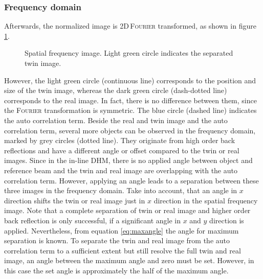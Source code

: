 \documentclass{article}
\begin{document}
\subsubsection{Frequency domain}
Afterwards, the normalized image is 2D\,\textsc{Fourier} transformed, as shown in figure \ref{fig:kpic}.
\begin{figure}[!ht]
    \centering
    \caption{Spatial frequency image. Light green circle indicates the separated twin image.}
    \label{fig:kpic}
\end{figure}
However, the light green circle (continuous line) corresponds to the position and size of the twin image, whereas the dark green circle (dash-dotted line) corresponds to the real image. In fact, there is no difference between them, since the \textsc{Fourier} transformation is symmetric. The blue circle (dashed line) indicates the auto correlation term. Beside the real and twin image and the auto correlation term, several more objects can be observed in the frequency domain, marked by grey circles (dotted line). They originate from high order back reflections and have a different angle or offset compared to the twin or real images. Since in the in-line DHM, there is no applied angle between object and reference beam and the twin and real image are overlapping with the auto correlation term. However, applying an angle leads to a separation between these three images in the frequency domain. Take into account, that an angle in $x$ direction shifts the twin or real image just in $x$ direction in the spatial frequency image. Note that a complete separation of twin or real image and higher order back reflection is only successful, if a significant angle in $x$ and $y$ direction is applied. Nevertheless, from equation \ref{eq:maxangle} the angle for maximum separation is known. To separate the twin and real image from the auto correlation term to a sufficient extent but still resolve the full twin and real image, an angle between the maximum angle and zero must be set. However, in this case the set angle is approximately the half of the maximum angle.
\end{document}
